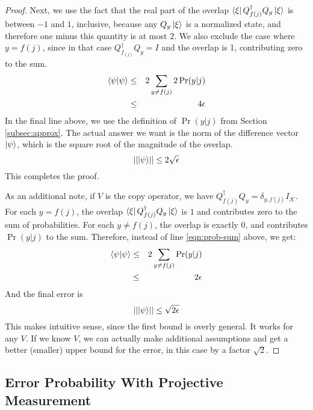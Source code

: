 \begin{proof}
Next, we use the fact that the real part of the overlap
$\left\langle{\xi}\right\vert Q_{f(j)}^{\dagger}Q_y \left\vert{\xi}\right\rangle$ is between $-1$ and $1$, inclusive,
because any $Q_y\left\vert{\xi}\right\rangle$ is a normalized state, and therefore one minus
this quantity is at most $2$. We also exclude the case where
$y = f(j)$, since in that case $Q_{f_(j)}^{\dagger}Q_y = I$ and the overlap
is 1, contributing zero to the sum.
%
\begin{eqnarray}
\langle \psi|\psi \rangle & \le & 2 \sum_{y \ne f(j)} 2\Pr(y|j) \label{eqn:prob-sum}\\
                    & \le & 4\epsilon
\end{eqnarray}
%
In the final line above, we use the definition of $\Pr(y|j)$ from
Section \ref{subsec:approx}. The actual answer we want is the norm
of the difference vector $\left\vert{\psi}\right\rangle$, which is the square root of the
magnitude of the overlap.
%
\begin{equation}
\lvert\lvert \left\vert{\psi}\right\rangle \rvert\rvert \le 2\sqrt{\epsilon}
\end{equation}
%
This completes the proof.

As an additional note, if $V$ is the copy operator, we have
$Q_{f(j)}^{\dagger}Q_y = \delta_{y,f(j)}I_{\mathcal{K}}$.
For each $y = f(j)$, the overlap $\left\langle{\xi}\right\vert Q_{f(j)}^{\dagger}Q_y \left\vert{\xi}\right\rangle$
is $1$ and contributes zero to the sum of probabilities.
For each $y \ne f(j)$, the overlap is exactly $0$, and contributes
$\Pr(y|j)$ to the sum.
Therefore, instead of line \ref{eqn:prob-sum} above, we get:
%
\begin{eqnarray}
\langle \psi|\psi \rangle & \le & 2\sum_{y \ne f(j)} \Pr(y|j)\\
                    & \le & 2\epsilon
\end{eqnarray}
%
And the final error is
%
\begin{equation}
\lvert\lvert \left\vert{\psi}\right\rangle \rvert\rvert \le \sqrt{2\epsilon}
\end{equation}
%
This makes intuitive sense, since the first bound is overly general.
It works for any $V$. If we know $V$, we can actually make additional
assumptions and get a better (smaller) upper bound for the error, in this
case by a factor $\sqrt{2}$.
\end{proof}

\subsection{Error Probability With Projective Measurement}
\label{subsec:error-proj}

